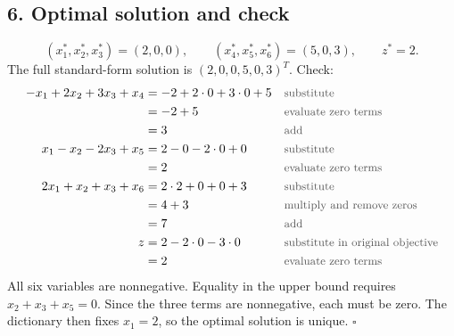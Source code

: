\documentclass[a4paper,11pt]{article}
\newif\ifexplain
\newcommand{\teil}[1]{\subsection*{#1}}
\newcommand{\why}[1]{\text{\small\color{black!65}#1}}
\newcommand{\explain}[1]{\ifexplain\begin{erklbox}#1\end{erklbox}\fi}
\newcommand{\explainfig}[1]{\ifexplain\begin{center}#1\end{center}\fi}
\begin{document}
\teil{6. Optimal solution and check}
\[\boxed{(x_1^*,x_2^*,x_3^*)=(2,0,0),\qquad (x_4^*,x_5^*,x_6^*)=(5,0,3),\qquad z^*=2.}\]
The full standard-form solution is $(2,0,0,5,0,3)^T$. Check:
\begin{align*}
-x_1+2x_2+3x_3+x_4&=-2+2\cdot0+3\cdot0+5&&\why{substitute}\\
&=-2+5&&\why{evaluate zero terms}\\
&=3&&\why{add}\\
x_1-x_2-2x_3+x_5&=2-0-2\cdot0+0&&\why{substitute}\\
&=2&&\why{evaluate zero terms}\\
2x_1+x_2+x_3+x_6&=2\cdot2+0+0+3&&\why{substitute}\\
&=4+3&&\why{multiply and remove zeros}\\
&=7&&\why{add}\\
z&=2-2\cdot0-3\cdot0&&\why{substitute in original objective}\\
&=2&&\why{evaluate zero terms}
\end{align*}
All six variables are nonnegative. Equality in the upper bound requires $x_2+x_3+x_5=0$.
Since the three terms are nonnegative, each must be zero. The dictionary then fixes $x_1=2$, so the optimal solution is unique. $\square$
\explain{In der ursprünglichen Aufgabe werden nur die ersten drei Variablen gesucht. Die Schlupfwerte dienen zusätzlich als Kontrolle. Die zweite Nebenbedingung ist aktiv, weil $x_5$ null ist. Bei der ersten bleiben $5$ Einheiten frei, bei der dritten $3$. Auch die Eindeutigkeit lässt sich direkt aus der Zielfunktionszeile lesen: Für denselben Optimalwert darf keiner der drei abgezogenen Terme positiv sein.}

\explainfig{\begin{tikzpicture}[x=2cm,y=1.1cm]
\draw[->] (0,0)--(2.6,0) node[right] {$x_1$};
\draw[->] (0,0)--(0,3) node[above] {$z$};
\draw[thick,blue] (0,0)--(2,2);
\draw[dashed] (2,0)--(2,2)--(0,2);
\fill (2,2) circle (2pt) node[above right] {Optimum};
\node[below] at (2,0) {$2$}; \node[left] at (0,2) {$2$};
\node at (1.15,2.7) {$x_2=x_3=0$, zulässiger Schritt};
\end{tikzpicture}}
\end{document}

